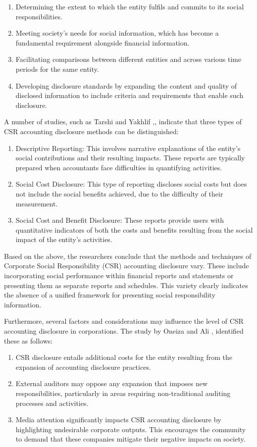 \documentclass{default}
\begin{document}
\begin{enumerate}
  \item Determining the extent to which the entity fulfils and commits to its social responsibilities.
  \item Meeting society's needs for social information, which has become a fundamental requirement alongside financial information.
  \item Facilitating comparisons between different entities and across various time periods for the same entity.
  \item Developing disclosure standards by expanding the content and quality of disclosed information to include criteria and requirements that enable such disclosure.
\end{enumerate}

A number of studies, such as Tarshi and Yakhlif \cite{ref4},, indicate that three types of CSR accounting disclosure methods can be distinguished:

\begin{enumerate}
  \item Descriptive Reporting: This involves narrative explanations of the entity's social contributions and their resulting impacts. These reports are typically prepared when accountants face difficulties in quantifying activities.
  \item Social Cost Disclosure: This type of reporting discloses social costs but does not include the social benefits achieved, due to the difficulty of their measurement.
  \item Social Cost and Benefit Disclosure: These reports provide users with quantitative indicators of both the costs and benefits resulting from the social impact of the entity's activities.
\end{enumerate}

Based on the above, the researchers conclude that the methods and techniques of Corporate Social Responsibility (CSR) accounting disclosure vary. These include incorporating social performance within financial reports and statements or presenting them as separate reports and schedules. This variety clearly indicates the absence of a unified framework for presenting social responsibility information.

Furthermore, several factors and considerations may influence the level of CSR accounting disclosure in corporations. The study by Oneiza and Ali \cite{ref26}, identified these as follows:

\begin{enumerate}
  \item CSR disclosure entails additional costs for the entity resulting from the expansion of accounting disclosure practices.
  \item External auditors may oppose any expansion that imposes new responsibilities, particularly in areas requiring non-traditional auditing processes and activities.
  \item Media attention significantly impacts CSR accounting disclosure by highlighting undesirable corporate outputs. This encourages the community to demand that these companies mitigate their negative impacts on society.
\end{enumerate}
\end{document}
